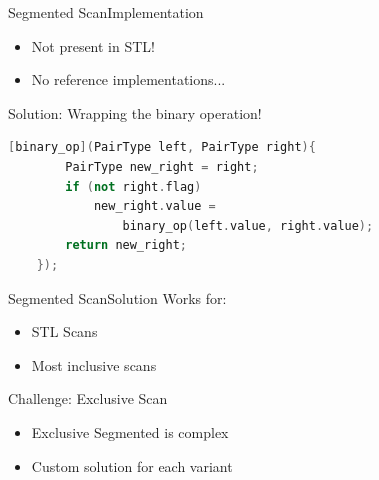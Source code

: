 \begin{frame}[fragile]{Segmented Scan}{Implementation}
    \begin{itemize}
     \item Not present in STL!
     \item No reference implementations...
    \end{itemize}
    \vspace{10pt}
    Solution: Wrapping the binary operation!
    
    
    \begin{lstlisting}[language=C++, frame=single, gobble=4]
    [binary_op](PairType left, PairType right){
        PairType new_right = right;
        if (not right.flag)
            new_right.value =
                binary_op(left.value, right.value);
        return new_right;
    });
    \end{lstlisting}
\end{frame} 
% 
% 


\begin{frame}[fragile]{Segmented Scan}{Solution}
Works for:
\begin{itemize}
 \item STL Scans
 \item Most inclusive scans
\end{itemize}
\vspace{10pt}
Challenge: Exclusive Scan
\begin{itemize}
 \item Exclusive Segmented is complex
 \item Custom solution for each variant
\end{itemize}

\end{frame}


